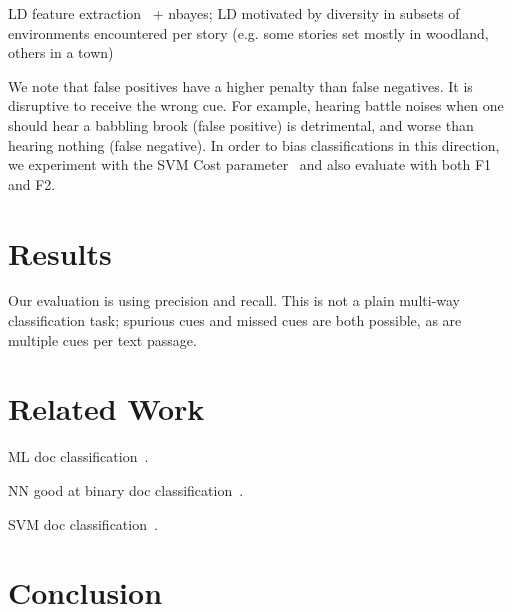 \documentclass[11pt]{article}
\begin{document}
LD feature extraction~\cite{lui2011cross} + nbayes; LD motivated by diversity in subsets of environments encountered per story (e.g. some stories set mostly in woodland, others in a town)

We note that false positives have a higher penalty than false negatives.
It is disruptive to receive the wrong cue.
For example, hearing battle noises when one should hear a babbling brook (false positive) is detrimental, and worse than hearing nothing (false negative).
In order to bias classifications in this direction, we experiment with the SVM Cost parameter~\cite{vapnik?joachims?} and also evaluate with both F1 and F2.


\section{Results}

Our evaluation is using precision and recall.
This is not a plain multi-way classification task; spurious cues and missed cues are both possible, as are multiple cues per text passage.

\section{Related Work}


ML doc classification~\cite{sebastiani2002machine}.

NN good at binary doc classification~\cite{derczynski2006machine}.

SVM doc classification~\cite{isa2008text}.

\section{Conclusion}

\iffalse
\section*{Acknowledgments}
This project has received funding from the European Union’s Seventh Framework Programme for research, technological development and demonstration under grant agreement No. 611233, \textsc{Pheme}.
ah, was anything funding this? could anything be associated with this?? ahhh, erm
\fi



\end{document}
